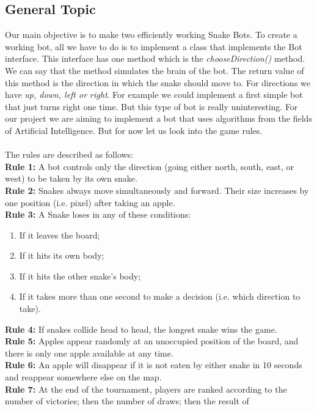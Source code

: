 \documentclass[a4paper,12pt]{article}
\begin{document}
\subsection{General Topic}
Our main objective is to make two efficiently working Snake Bots. To create a working bot, all we have to do is to implement a class that implements the Bot interface. This interface has one method which is the \textit{chooseDirection()} method. We can say that the method simulates the brain of the bot. The return value of this method is the direction in which the snake should move to. For directions we have \textit{up, down, left or right}. For example we could implement a first simple bot that just turns right one time. But this type of bot is really uninteresting. For our project we are aiming to implement a bot that uses algorithms from the fields of Artificial Intelligence. But for now let us look into the game rules.\\
\\The rules are described as follows: \\
\textbf{Rule 1:}  A bot controls only the direction (going either north, south, east, or west) to
be taken by its own snake.\\
\textbf{Rule 2:} Snakes always move simultaneously and forward. Their size increases by one position
(i.e. pixel) after taking an apple.\\
\textbf{Rule 3:} A Snake loses in any of these conditions:\\
\begin{enumerate}
\item If it leaves the board;
\item If it hits its own body;
\item If it hits the other snake's body;
\item If it takes more than one second to make a decision (i.e. which direction to take).
\end{enumerate}
\textbf{Rule 4:} If snakes collide head to head, the longest snake wins the game.\\
\textbf{Rule 5:} Apples appear randomly at an unoccupied position of the board, and there is only
one apple available at any time.\\
\textbf{Rule 6:} An apple will disappear if it is not eaten by either snake in 10 seconds and reappear
somewhere else on the map.\\
\textbf{Rule 7:} At the end of the tournament, players are ranked according to the number of
victories; then the number of draws; then the result of\\
\end{document}
